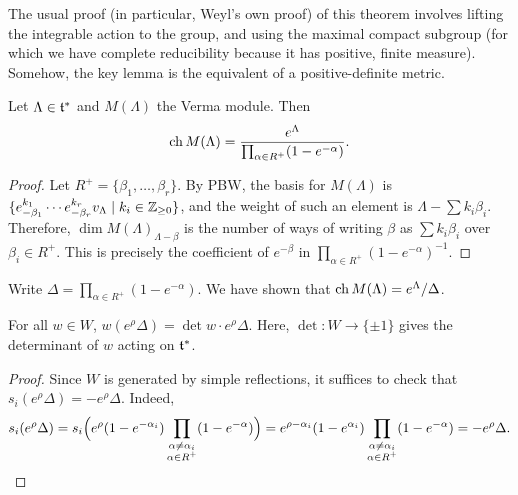 \begin{remark}
The usual proof (in particular, Weyl's own proof) of this theorem involves
lifting the integrable action to the group, and using the maximal compact
subgroup (for which we have complete reducibility because it has positive,
finite measure). Somehow, the key lemma is the equivalent of a positive-definite
metric.
\end{remark}

\begin{lemma}
Let $\Lambda \in \mathfrak{t}^*$ and $M(\Lambda)$ the Verma module. Then
\[
  \operatorname{ch} M(\Lambda) = \frac{e^\Lambda}{\prod_{\alpha \in R^+} (1 - e^{-\alpha})}.
\]
\end{lemma}


\begin{proof}
Let $R^+ = \{\beta_1, \dots, \beta_r\}$. By PBW, the basis for $M(\Lambda)$ is
$\{e_{-\beta_1}^{k_1}\cdots e_{-\beta_r}^{k_r}v_\Lambda \mid k_i \in \mathbb{Z}_{\geq 0}\}$,
and the weight of such an element is $\Lambda - \sum k_i\beta_i$. Therefore,
$\dim M(\Lambda)_{\Lambda - \beta}$ is the number of ways of writing $\beta$
as $\sum k_i\beta_i$ over $\beta_i \in R^+$. This is precisely the coefficient
of $e^{-\beta}$ in $\prod_{\alpha \in R^+} (1 - e^{-\alpha})^{-1}$.
\end{proof}

Write $\Delta = \prod_{\alpha \in R^+} (1 - e^{-\alpha})$. We have shown that
$\operatorname{ch} M(\Lambda) = e^\Lambda/\Delta$.

\begin{lemma}
For all $w \in W$, $w(e^\rho\Delta) = \det w \cdot e^\rho\Delta$. Here,
$\det\colon W \to \{\pm 1\}$ gives the determinant of $w$ acting on $\mathfrak{t}^*$.
\end{lemma}

\begin{proof}
Since $W$ is generated by simple reflections, it suffices to check that
$s_i(e^\rho\Delta) = -e^\rho\Delta$. Indeed,
\[
  s_i(e^\rho\Delta)
  = s_i\Bigl(e^\rho(1 - e^{-\alpha_i})\prod_{\substack{\alpha \neq \alpha_i\\ \alpha \in R^+}} (1 - e^{-\alpha})\Bigr)
  = e^{\rho - \alpha_i}(1 - e^{\alpha_i})\prod_{\substack{\alpha \neq \alpha_i\\ \alpha \in R^+}} (1 - e^{-\alpha})
  = -e^\rho\Delta. \qedhere
\]
\end{proof}

